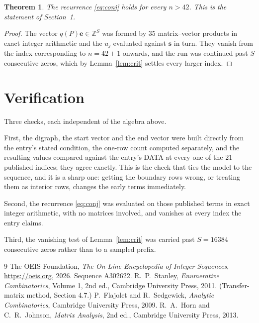 \documentclass[11pt,a4paper]{article}
\theoremstyle{plain}
\newtheorem{theorem}{Theorem}
\theoremstyle{definition}
\begin{document}
\begin{theorem}
The recurrence \eqref{eq:conj} holds for every $n>42$. This is the statement of
Section~1.
\end{theorem}

\begin{proof}
The vector $q(P)\mathbf{e}\in\mathbb{Z}^{S}$ was formed by $35$ matrix--vector
products in exact integer arithmetic and the $u_j$ evaluated against $\mathbf{s}$ in turn.
They vanish from the index corresponding to $n=42+1$ onwards, and the run was continued
past $S$ consecutive zeros, which by Lemma~\ref{lem:crit} settles every larger index.
\end{proof}

\section{Verification}

Three checks, each independent of the algebra above.

First, the digraph, the start vector and the end vector were built directly from the
entry's stated condition, the one-row count computed separately, and the resulting values
compared against the entry's DATA at every one of the $21$ published indices; they
agree exactly. This is the check that ties the model to the sequence, and it is a sharp one:
getting the boundary rows wrong, or treating them as interior rows, changes the early terms
immediately.

Second, the recurrence \eqref{eq:conj} was evaluated on those published terms in exact
integer arithmetic, with no matrices involved, and vanishes at every index the entry claims.

Third, the vanishing test of Lemma~\ref{lem:crit} was carried past $S=16384$ consecutive
zeros rather than to a sampled prefix.

\begin{thebibliography}{9}
 The OEIS Foundation, \emph{The On-Line Encyclopedia of Integer
Sequences}, \url{https://oeis.org}, 2026. Sequence A302622.
 R.~P.~Stanley, \emph{Enumerative Combinatorics}, Volume 1, 2nd ed.,
Cambridge University Press, 2011. (Transfer-matrix method, Section 4.7.)
 P.~Flajolet and R.~Sedgewick, \emph{Analytic Combinatorics}, Cambridge
University Press, 2009.
 R.~A.~Horn and C.~R.~Johnson, \emph{Matrix Analysis}, 2nd ed., Cambridge
University Press, 2013.
\end{thebibliography}
\end{document}
